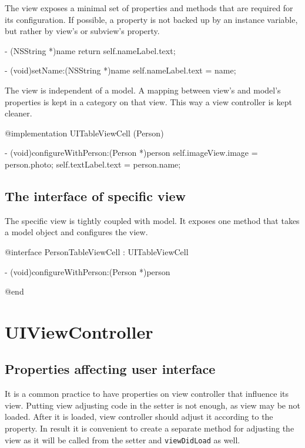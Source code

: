 \documentclass[10pt]{extarticle}
\newenvironment{codelisting}
{\footnotesize\mdframed[middlelinewidth=0.5pt, middlelinecolor=BaliHaiColor, skipabove=15pt]\verbatim}
{\endverbatim\endmdframed\vspace{12pt}\normalsize}
\newcommand{\inlinecode}[1]{{\textcolor{TundoraColor}{\texttt{#1}}}}
\begin{document}
The view exposes a minimal set of properties and methods that are required for its configuration.
If possible, a property is not backed up by an instance variable, but rather by view's or subview's property.

\begin{codelisting}
- (NSString *)name
{
    return self.nameLabel.text;
}

- (void)setName:(NSString *)name
{
    self.nameLabel.text = name;
}
\end{codelisting}

The view is independent of a model. A mapping between view's and model's properties is kept in a category on that view. This way a view controller is kept cleaner.

\begin{codelisting}
@implementation UITableViewCell (Person)

- (void)configureWithPerson:(Person *)person
{
    self.imageView.image = person.photo;
    self.textLabel.text = person.name;
}
\end{codelisting}


\subsection{The interface of specific view}

The specific view is tightly coupled with model. It exposes one method that takes a model object and configures the view.

\begin{codelisting}
@interface PersonTableViewCell : UITableViewCell

- (void)configureWithPerson:(Person *)person

@end
\end{codelisting}


\section{UIViewController}

\subsection{Properties affecting user interface}

It is a common practice to have properties on view controller that influence its view. Putting view adjusting code in the setter is not enough, as view may be not loaded. After it is loaded, view controller should adjust it according to the property. In result it is convenient to create a separate method for adjusting the view as it will be called from the setter and \inlinecode{viewDidLoad} as well.
\end{document}
